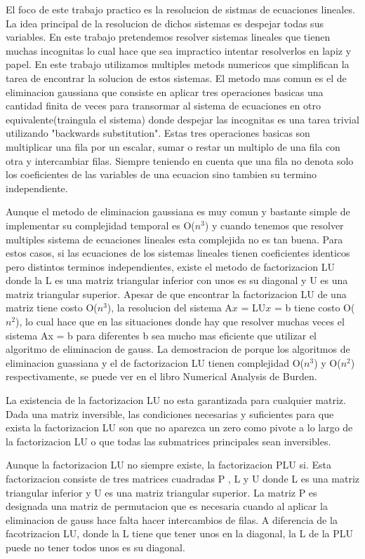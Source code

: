 El foco de este trabajo practico es la resolucion de sistmas de ecuaciones lineales. La idea principal de la resolucion de dichos sistemas es despejar todas sus variables. En este trabajo pretendemos resolver sistemas lineales que tienen muchas incognitas lo cual hace que sea impractico intentar resolverlos en lapiz y papel. En este trabajo utilizamos multiples metods numericos que simplifican la tarea de encontrar la solucion de estos sistemas. El metodo mas comun es el de eliminacion gaussiana que consiste en aplicar tres operaciones basicas una cantidad finita de veces para transormar al sistema de ecuaciones en otro equivalente(traingula el sistema) donde despejar las incognitas es una tarea trivial utilizando "backwards substitution". Estas tres operaciones basicas son multiplicar una fila por un escalar, sumar o restar un multiplo de una fila con otra y intercambiar filas. Siempre teniendo en cuenta que una fila no denota solo los coeficientes de las variables de una ecuacion sino tambien su termino independiente.\par
\indent Aunque el metodo de eliminacion gaussiana es muy comun y bastante simple de implementar su complejidad temporal es O($n^{3}$) y cuando tenemos que resolver multiples sistema de ecuaciones lineales esta complejida no es tan buena. Para estos casos, si las ecuaciones de los sistemas lineales tienen coeficientes identicos pero distintos terminos independientes, existe el metodo de factorizacion LU donde la L es una matriz triangular inferior con unos es su diagonal y U es una matriz triangular superior. Apesar de que encontrar la factorizacion LU de una matriz tiene costo O($n^{3}$), la resolucion del sistema A$x$ = LU$x$ = b tiene costo O($n^{2}$), lo cual hace que en las situaciones donde hay que resolver muchas veces el sistema Ax = b para diferentes b sea mucho mas eficiente que utilizar el algoritmo de eliminacion de gauss. La demostracion de porque los algoritmos de eliminacion guassiana y el de factorizacion LU tienen complejidad O($n^{3}$) y O($n^{2}$) respectivamente, se puede ver en el libro Numerical Analysis de Burden. \par
\indent La existencia de la factorizacion LU no esta garantizada para cualquier matriz. Dada una matriz inversible, las condiciones necesarias y suficientes para que exista la factorizacion LU son que no aparezca un zero como pivote a lo largo de la factorizacion LU o que todas las submatrices principales sean inversibles.\par
Aunque la factorizacion LU no siempre existe, la factorizacion PLU si. Esta factorizacion consiste de tres matrices cuadradas P , L y U donde L es una matriz triangular inferior y U es  una matriz triangular superior.  La matriz P es designada una matriz de permutacion que es necesaria cuando al aplicar la eliminacion de gauss hace falta hacer intercambios de filas. A diferencia de la facotrizacion LU, donde la L tiene que tener unos en la diagonal, la L de la PLU puede no tener todos unos es su diagonal.\par
